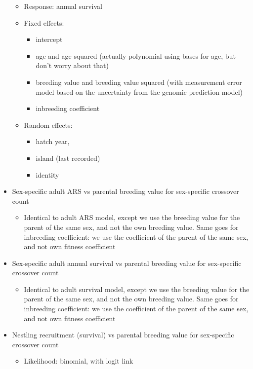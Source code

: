 \documentclass[dvipsnames]{article}
\begin{document}
\begin{itemize}
\begin{itemize}
        \item Response: annual survival
        \item Fixed effects: \begin{itemize}
            \item intercept
            \item age and age squared (actually polynomial using bases for age, but don't worry about that)
            \item breeding value and breeding value squared (with measurement error model based on the uncertainty from the genomic prediction model)
            \item inbreeding coefficient
        \end{itemize} 
        \item Random effects: \begin{itemize}
            \item hatch year, 
            \item island (last recorded)
            \item identity
        \end{itemize}
    \end{itemize}
    \item Sex-specific adult ARS vs parental breeding value for sex-specific crossover count \begin{itemize}
        \item Identical to adult ARS model, except we use the breeding value for the parent of the same sex, and not the own breeding value. Same goes for inbreeding coefficient: we use the coefficient of the parent of the same sex, and not own fitness coefficient
    \end{itemize}
    \item Sex-specific adult annual survival vs parental breeding value for sex-specific crossover count \begin{itemize}
        \item Identical to adult survival model, except we use the breeding value for the parent of the same sex, and not the own breeding value. Same goes for inbreeding coefficient: we use the coefficient of the parent of the same sex, and not own fitness coefficient
    \end{itemize}
    \item Nestling recruitment (survival) vs parental breeding value for sex-specific crossover count \begin{itemize}
        \item Likelihood: binomial, with logit link

\end{itemize}
\end{itemize}
\end{document}
